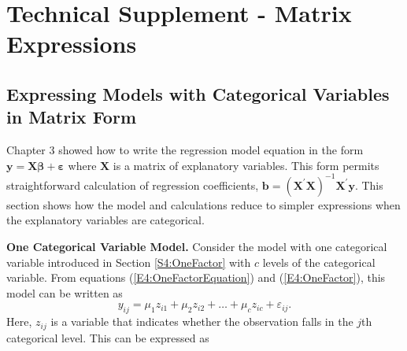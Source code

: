 \section{Technical Supplement - Matrix Expressions}
 \setcounter{equation}{12}
\subsection{Expressing Models with Categorical Variables in
Matrix Form}\label{S4:CatVarMatrix}

Chapter 3 showed how to write the regression model equation in the
form $\mathbf{y=X} \boldsymbol \beta + \boldsymbol \varepsilon$
where $\mathbf{X}$ is a matrix of explanatory variables. This form
permits straightforward calculation of regression coefficients,
$\mathbf{b} = \left(\mathbf{X}^{\prime}
\mathbf{X}\right)^{-1}\mathbf{X}^{\prime} \mathbf{y}$. This section
shows how the model and calculations reduce to simpler expressions
when the explanatory variables are categorical.


\textbf{One Categorical Variable Model.} Consider the model with one
categorical variable introduced in Section \ref{S4:OneFactor} with
$c$ levels of the categorical variable. From equations
(\ref{E4:OneFactorEquation}) and (\ref{E4:OneFactor}), this model
can be written as
\begin{equation*}
y_{ij} = \mu_1 z_{i1} + \mu_2 z_{i2} + \ldots + \mu_c z_{ic} +
\varepsilon_{ij}.
\end{equation*}
Here, $z_{ij}$ is a variable that indicates whether the observation
falls in the $j$th categorical level. This can be expressed as


